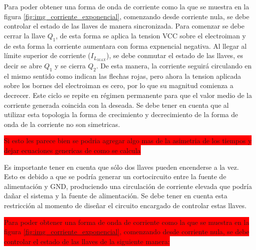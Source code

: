 Para poder obtener una forma de onda de corriente como la que se muestra en la figura \ref{fig:img_corriente_exponencial}, comenzando desde corriente nula, se debe controlar el estado de las llaves de manera sincronizada. Para comenzar se debe cerrar la llave  $Q_1$, de esta forma se aplica la tension VCC sobre el electroiman y de esta forma la corriente aumentara con forma expnencial negativa. Al llegar al límite superior de corriente ($I_{L_{MAX}}$), se debe conmutar el estado de las llaves, es decir se abre $Q_1$ y se cierra $Q_2$. De esta manera, la corriente seguirá circulando en el mismo sentido como indican las flechas rojas, pero ahora la tension aplicada sobre los bornes del electroiman es cero, por lo que su magnitud comienza a decrecer. Este ciclo se repite en régimen permanente para que el valor medio de la corriente generada coincida con la deseada. Se debe tener en cuenta que al utilizar esta topologia la forma de crecimiento y decrecimiento de la forma de onda de la corriente no son simetricas. 

\colorbox{red}{Si esto les parece bien se podria agregar algo mas de la asimetria de los tiempos y dejar ecuaciones genericas de como se calcula}

Es importante tener en cuenta que sólo dos llaves pueden encenderse a la vez. Esto es debido a que se podría generar un cortocircuito entre la fuente de alimentación y GND, produciendo una circulación de corriente elevada que podría dañar el sistema y la fuente de alimentación. Se debe tener en cuenta esta restricción al momento de diseñar el circuito encargado de controlar estas llaves.

\colorbox{red}{Para poder obtener una forma de onda de corriente como la que se muestra en la figura \ref{fig:img_corriente_exponencial}, comenzando desde corriente nula, se debe controlar el estado de las llaves de la siguiente manera:}

